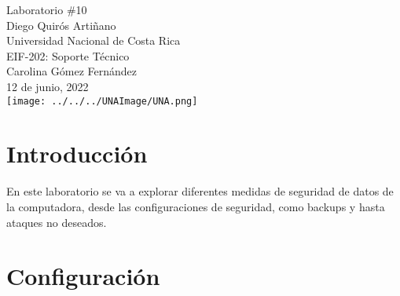 \documentclass[stu, 12pt, letterpaper, donotrepeattitle, floatsintext, natbib, helv]{apa7}
\begin{document}
\begin{titlepage}
    \centering
    \vfill
    \LARGE Laboratorio \#10\\
    \vskip2cm
    \large Diego Quirós Artiñano \\
    Universidad Nacional de Costa Rica \\
    EIF-202: Soporte Técnico \\ 
    Carolina Gómez Fernández \\
    12 de junio, 2022 \\
    \vfill
    \texttt{[image: ../../../UNAImage/UNA.png]} \\
    \vfill
    \vfill
\end{titlepage}

\addto{}
\tableofcontents
\setcounter{tocdepth}{2}
\newpage


\section*{Introducción}
{}
En este laboratorio se va a explorar diferentes medidas de seguridad de datos de la computadora, desde las configuraciones de seguridad, como backups y hasta ataques no deseados.

\section*{Configuración}
{}



\end{document}
